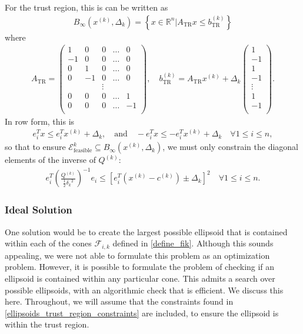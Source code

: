 \documentclass{article}
\theoremstyle{case}
\newcommand{\atr}{{A_{\text{TR}}}}
\newcommand{\btrk}{{b^{(k)}_{\text{TR}}}}
\newcommand{\ck}{{c^{(k)}}}
\newcommand{\dk}{\Delta_k}
\newcommand{\fik}{{\mathcal F_{i, k}}}
\newcommand{\qk}{{Q^{(k)}}}
\newcommand{\Rn}{\mathbb R^n}
\newcommand{\sdk}{{\delta_k}}
\newcommand{\tr}{{ B_{\infty}\left(\xk, \dk\right) }}
\newcommand{\unshiftedellipsoid}{{\mathcal E^k_{\text{feasible}}}}
\newcommand{\xk}{{x^{(k)}}}
\begin{document}
For the trust region, this is can be written as
\begin{align*}
\tr = \left\{ x \in \Rn | \atr x\le\btrk\right\}
\end{align*}
where
\begin{align*}
\atr = \begin{pmatrix}
 1 &  0 & 0      & \ldots &  0 \\
-1 &  0 & 0      & \ldots &  0 \\
 0 &  1 & 0      & \ldots &  0 \\
 0 & -1 & 0      & \ldots &  0 \\
   &    & \vdots &        &    \\
 0 &  0 &      0 & \ldots &  1 \\
 0 &  0 &      0 & \ldots & -1 \\
\end{pmatrix}, \quad
\btrk = \atr \xk + \dk \begin{pmatrix}
1 \\
-1 \\
1 \\
-1 \\
\vdots \\
1 \\
-1 \\
\end{pmatrix}.
\end{align*}
In row form, this is
\begin{align*}
e_i ^T x \le e_i^T\xk + \dk, \quad \textrm{and} \quad
-e_i ^T x \le -e_i^T\xk + \dk \quad \forall 1 \le i \le n,
\end{align*}
so that to ensure $\unshiftedellipsoid \subseteq \tr$, we must only constrain the diagonal elements of the inverse of $\qk$:
\begin{align}
e_i^T\left(\frac{\qk}{\frac 1 2 \sdk^2}\right)^{-1} e_i \le \left[e_i^T\left(\xk - \ck\right) \pm \dk \right]^2 \quad \forall 1 \le i \le n.
\label{ellipsoids_trust_region_constraints}
\end{align}


\subsubsection{Ideal Solution}
\label{ideal_ellipsoid_in_polyhedron}

One solution would be to create the largest possible ellipsoid that is contained within each of the cones $\fik$ defined in \cref{define_fik}.
Although this sounds appealing, we were not able to formulate this problem as an optimization problem.
However, it is possible to formulate the problem of checking if an ellipsoid is contained within any particular cone.
This admits a search over possible ellipsoids, with an algorithmic check that is efficient.
We discuss this here.
Throughout, we will assume that the constraints found in \cref{ellipsoids_trust_region_constraints} are included, to ensure the ellipsoid is within the trust region.
\end{document}
